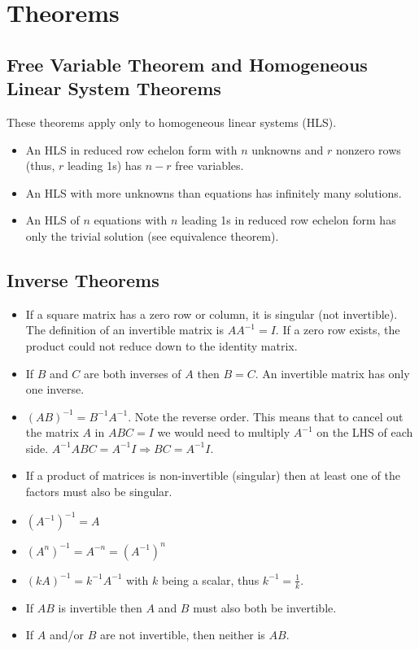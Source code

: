 \documentclass[12pt]{article}
\begin{document}
\section{Theorems}


\subsection{Free Variable Theorem and Homogeneous Linear System Theorems}

These theorems apply only to homogeneous linear systems (HLS).
\begin{itemize}
    \item An HLS in reduced row echelon form with $n$ unknowns and $r$ nonzero rows (thus, $r$ leading 1s) has $n - r$ free variables.
    \item An HLS with more unknowns than equations has infinitely many solutions.
    \item An HLS of $n$ equations with $n$ leading 1s in reduced row echelon form has only the trivial solution (see equivalence theorem).
\end{itemize}


\subsection{Inverse Theorems}

\begin{itemize}
    \item If a square matrix has a zero row or column, it is singular (not invertible). The definition of an invertible matrix is $AA^{-1} = I$. If a zero row exists, the product could not reduce down to the identity matrix.
    \item If $B$ and $C$ are both inverses of $A$ then $B = C$. An invertible matrix has only one inverse.
    \item $(AB)^{-1} = B^{-1}A^{-1}$. Note the reverse order. This means that to cancel out the matrix $A$ in $ABC = I$ we would need to multiply $A^{-1}$ on the LHS of each side. $A^{-1}ABC = A^{-1}I \Rightarrow BC = A^{-1}I$.
    \item If a product of matrices is non-invertible (singular) then at least one of the factors must also be singular.
    \item $(A^{-1})^{-1} = A$
    \item $(A^n)^{-1} = A^{-n} = (A^{-1})^n$
    \item $(kA)^{-1} = k^{-1}A^{-1}$ with $k$ being a scalar, thus $k^{-1} = \frac{1}{k}$.
    \item If $AB$ is invertible then $A$ and $B$ must also both be invertible.
    \item If $A$ and/or $B$ are not invertible, then neither is $AB$.
\end{itemize}
\end{document}

